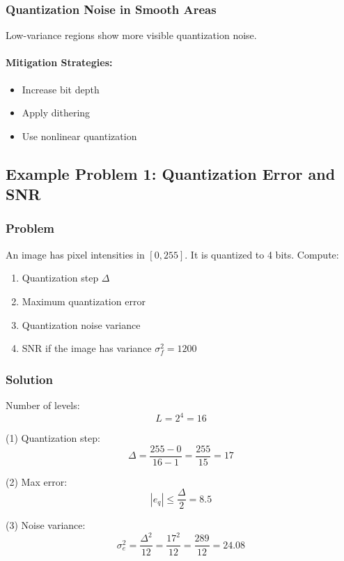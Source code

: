 \documentclass{AnantDocumentation}
\begin{document}
\subsubsection{Quantization Noise in Smooth Areas}
Low-variance regions show more visible quantization noise.

\paragraph{Mitigation Strategies:}
\begin{itemize}
\item Increase bit depth
\item Apply dithering
\item Use nonlinear quantization
\end{itemize}

\subsection{Example Problem 1: Quantization Error and SNR}

\subsubsection*{Problem}

An image has pixel intensities in $[0, 255]$.  
It is quantized to 4 bits.  
Compute:

\begin{enumerate}
\item Quantization step $\Delta$
\item Maximum quantization error
\item Quantization noise variance
\item SNR if the image has variance $\sigma_f^2 = 1200$
\end{enumerate}

\subsubsection*{Solution}

Number of levels:
\[
L = 2^4 = 16
\]

(1) Quantization step:
\[
\Delta = \frac{255 - 0}{16 - 1} = \frac{255}{15} = 17
\]

(2) Max error:
\[
|e_q| \leq \frac{\Delta}{2} = 8.5
\]

(3) Noise variance:
\[
\sigma_e^2 = \frac{\Delta^2}{12} = \frac{17^2}{12}
= \frac{289}{12} = 24.08
\]
\end{document}
